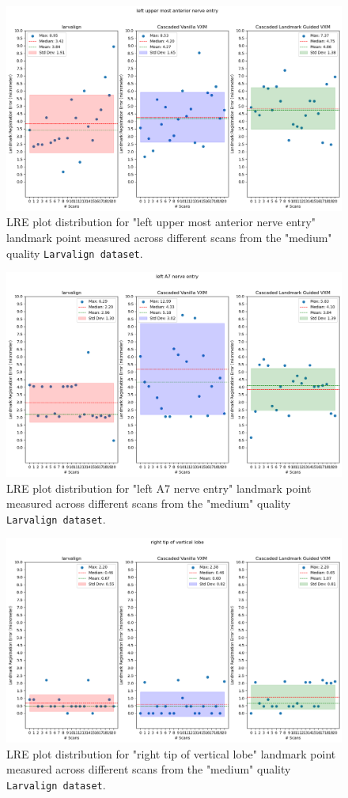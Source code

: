 \documentclass{book}
\begin{document}
	\begin{figure}[h!]
		\centering
		\includegraphics[width=0.75\columnwidth]{resources/chapter5_fresh/output/left upper most anterior nerve entry.png}
		\caption{LRE plot distribution for "left upper most anterior nerve entry" landmark point measured across different scans from the "medium" quality \texttt{Larvalign dataset}.}
		\label{fig:landmark21}
	\end{figure}
	
	\begin{figure}[h!]
		\centering
		\includegraphics[width=0.75\columnwidth]{resources/chapter5_fresh/output/left A7 nerve entry.png}
		\caption{LRE plot distribution for "left A7 nerve entry" landmark point measured across different scans from the "medium" quality \texttt{Larvalign dataset}.}
		\label{fig:landmark22}
	\end{figure}
	
	\begin{figure}[h!]
		\centering
		\includegraphics[width=0.75\columnwidth]{resources/chapter5_fresh/output/right tip of vertical lobe.png}
		\caption{LRE plot distribution for "right tip of vertical lobe" landmark point measured across different scans from the "medium" quality \texttt{Larvalign dataset}.}
		\label{fig:landmark23}
	\end{figure}
	
\end{document}
